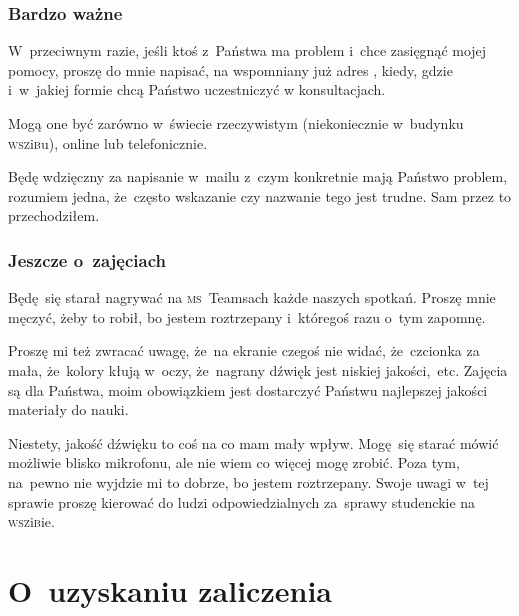 \documentclass[10pt,t]{beamer}
\begin{document}
\begin{frame}
  \frametitle{Bardzo ważne}


  W~przeciwnym razie, jeśli ktoś z~Państwa ma problem i~chce zasięgnąć
  mojej pomocy, proszę do mnie napisać, na wspomniany już adres \email,
  kiedy, gdzie i~w~jakiej formie chcą Państwo uczestniczyć w konsultacjach.

  Mogą one być zarówno w~świecie rzeczywistym (niekoniecznie w~budynku
  \textsc{wsz}i\textsc{b}u), online lub telefonicznie.

  Będę wdzięczny za napisanie w~mailu z~czym konkretnie mają Państwo
  problem, rozumiem jedna, że~często wskazanie czy nazwanie tego jest
  trudne. Sam przez to przechodziłem.

\end{frame}





\begin{frame}
  \frametitle{Jeszcze o~zajęciach}


  Będę~się starał nagrywać na \textsc{ms}~Teamsach każde naszych spotkań.
  Proszę mnie męczyć, żeby to robił, bo jestem roztrzepany i~któregoś
  razu o~tym zapomnę.

  Proszę mi też zwracać uwagę, że~na ekranie czegoś nie widać,
  że~czcionka za mała, że~kolory kłują w~oczy, że~nagrany dźwięk
  jest niskiej jakości,~etc. Zajęcia są dla Państwa, moim obowiązkiem jest
  dostarczyć Państwu najlepszej jakości materiały do nauki.

  Niestety, jakość dźwięku to coś na co mam mały wpływ. Mogę~się starać
  mówić możliwie blisko mikrofonu, ale nie wiem co więcej mogę zrobić.
  Poza tym, na~pewno nie wyjdzie mi to dobrze, bo jestem roztrzepany.
  Swoje uwagi w~tej sprawie proszę kierować do ludzi odpowiedzialnych
  za~sprawy studenckie na \textsc{wsz}i\textsc{b}ie.

\end{frame}










\section{O~uzyskaniu zaliczenia}
\end{document}
